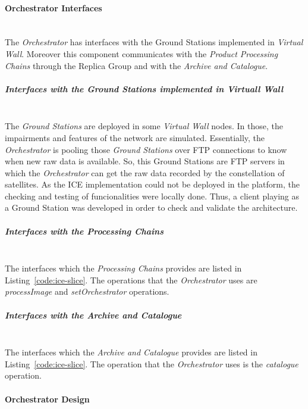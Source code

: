 \paragraph{Orchestrator Interfaces}~\\

The \emph{Orchestrator} has interfaces with the Ground Stations implemented in
\emph{Virtual Wall}. Moreover this component  communicates with the \emph{Product Processing Chains} through the Replica
Group and with the
\emph{Archive and Catalogue}. 

\subparagraph{Interfaces with the Ground Stations implemented in Virtuall
  Wall}~\\

The \emph{Ground Stations} are deployed in some \emph{Virtual Wall} nodes. In
those, the impairments and features of the network are simulated. Essentially,
the \emph{Orchestrator} is pooling those \emph{Ground Stations} over \ac{FTP}
connections to know when new raw data is available. So, this Ground Stations are
\ac{FTP} servers in which the \emph{Orchestrator} can get the raw data recorded
by the constellation of satellites. 
As the ICE implementation could not be
deployed in the \bonfire platform, the checking and testing of funcionalities
were locally done. Thus, a client playing as a Ground Station was developed in
order to check and validate the architecture. 

\subparagraph{Interfaces with the  Processing Chains}~\\

The interfaces which the \emph{Processing Chains} provides are listed in
Listing~\ref{code:ice-slice}. The operations that the \emph{Orchestrator} uses
are \emph{processImage} and \emph{setOrchestrator} operations. 

\subparagraph{Interfaces with the Archive and Catalogue}~\\

The interfaces which the \emph{Archive and Catalogue} provides are listed in
Listing~\ref{code:ice-slice}. The operation that the \emph{Orchestrator} uses is
the \emph{catalogue} operation.


\paragraph{Orchestrator Design}~\\

